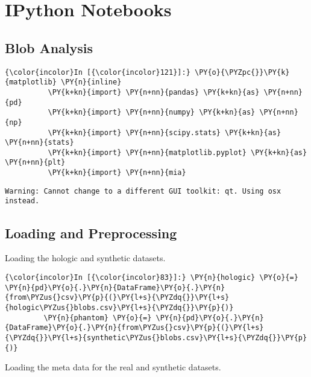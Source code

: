 \chapter{IPython Notebooks}

\section*{Blob Analysis}

    \begin{Verbatim}[commandchars=\\\{\}]
{\color{incolor}In [{\color{incolor}121}]:} \PY{o}{\PYZpc{}}\PY{k}{matplotlib} \PY{n}{inline}
          \PY{k+kn}{import} \PY{n+nn}{pandas} \PY{k+kn}{as} \PY{n+nn}{pd}
          \PY{k+kn}{import} \PY{n+nn}{numpy} \PY{k+kn}{as} \PY{n+nn}{np}
          \PY{k+kn}{import} \PY{n+nn}{scipy.stats} \PY{k+kn}{as} \PY{n+nn}{stats}
          \PY{k+kn}{import} \PY{n+nn}{matplotlib.pyplot} \PY{k+kn}{as} \PY{n+nn}{plt}
          \PY{k+kn}{import} \PY{n+nn}{mia}
\end{Verbatim}

    \begin{Verbatim}[commandchars=\\\{\}]
Warning: Cannot change to a different GUI toolkit: qt. Using osx instead.
    \end{Verbatim}

    \section{Loading and Preprocessing}\label{loading-and-preprocessing}

    Loading the hologic and synthetic datasets.

    \begin{Verbatim}[commandchars=\\\{\}]
{\color{incolor}In [{\color{incolor}83}]:} \PY{n}{hologic} \PY{o}{=} \PY{n}{pd}\PY{o}{.}\PY{n}{DataFrame}\PY{o}{.}\PY{n}{from\PYZus{}csv}\PY{p}{(}\PY{l+s}{\PYZdq{}}\PY{l+s}{hologic\PYZus{}blobs.csv}\PY{l+s}{\PYZdq{}}\PY{p}{)}
         \PY{n}{phantom} \PY{o}{=} \PY{n}{pd}\PY{o}{.}\PY{n}{DataFrame}\PY{o}{.}\PY{n}{from\PYZus{}csv}\PY{p}{(}\PY{l+s}{\PYZdq{}}\PY{l+s}{synthetic\PYZus{}blobs.csv}\PY{l+s}{\PYZdq{}}\PY{p}{)}
\end{Verbatim}

    Loading the meta data for the real and synthetic datasets.

